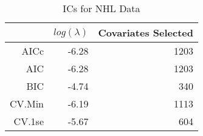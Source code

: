 \begin{table}[ht]
\centering
\begin{tabular}{rrr}
  \hline
 & $log(\lambda)$ & Covariates Selected \\ 
  \hline
AICc & -6.28 & 1203 \\ 
  AIC & -6.28 & 1203 \\ 
  BIC & -4.74 & 340 \\ 
  CV.Min & -6.19 & 1113 \\ 
  CV.1se & -5.67 & 604 \\ 
   \hline
\end{tabular}
\caption{ICs for NHL Data} 
\label{tab:ic}
\end{table}
